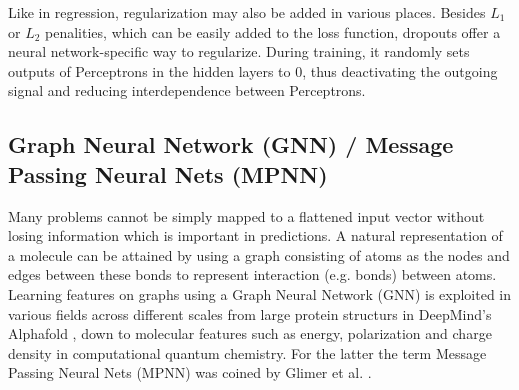 Like in regression, regularization may also be added in various places. Besides $L_1$ or $L_2$ penalities, which can be easily added to the loss function, dropouts offer a neural network-specific way to regularize. During training, it randomly sets outputs of Perceptrons in the hidden layers to 0, thus deactivating the outgoing signal and reducing interdependence between Perceptrons. 

\subsection{Graph Neural Network (GNN) / Message Passing Neural Nets (MPNN)}
\label{subsec:background_gnn}
Many problems cannot be simply mapped to a flattened input vector without losing information which is important in predictions. A natural representation of a molecule can be attained by using a graph consisting of atoms as the nodes and edges between these bonds to represent interaction (e.g. bonds) between atoms. Learning features on graphs using a Graph Neural Network (GNN) is exploited in various fields across different scales from large protein structurs in DeepMind's Alphafold \parencite{ref:alphafold}, down to molecular features such as energy, polarization and charge density in computational quantum chemistry. For the latter the term Message Passing Neural Nets (MPNN) was coined by Glimer et al. \parencite{ref:gilmer2017neural}.\\

